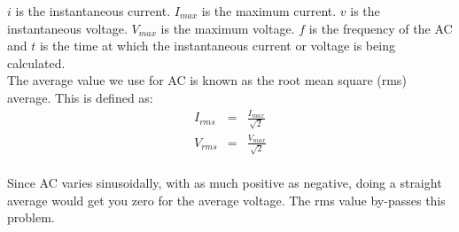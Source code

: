 $i$ is the instantaneous current. $I_{max}$ is the maximum current. $v$ is the instantaneous voltage. $V_{max}$ is the maximum voltage. $f$ is the frequency of the AC and $t$ is the time at which the instantaneous current or voltage is being calculated.\\
The average value we use for AC is known as the root mean square (rms) average. This is defined as:
\begin{eqnarray*}
I_{rms}&=&\frac{I_{max}}{\sqrt{2}}\\
V_{rms}&=&\frac{V_{max}}{\sqrt{2}}
\end{eqnarray*}\\
Since AC varies sinusoidally, with as much positive as negative, doing a straight average would get you zero for the average voltage. The rms value by-passes this problem.


